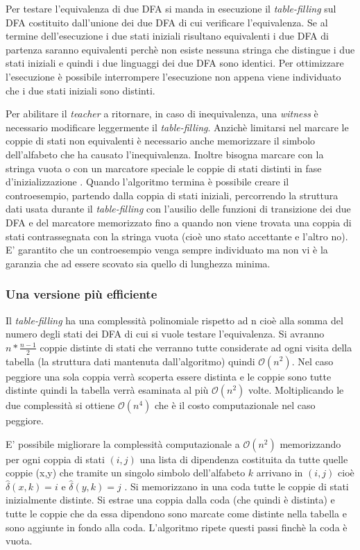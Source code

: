 Per testare l'equivalenza di due DFA si manda in esecuzione il \textit{table-filling} sul DFA costituito dall'unione dei due DFA di cui verificare l'equivalenza. Se al termine dell'esecuzione i due stati iniziali risultano equivalenti i due DFA di partenza saranno equivalenti perchè non esiste nessuna stringa che distingue i due stati iniziali e quindi i due linguaggi dei due DFA sono identici. Per ottimizzare l'esecuzione è possibile interrompere l'esecuzione non appena viene individuato che i due stati iniziali sono distinti.

Per abilitare il \textit{teacher} a ritornare, in caso di inequivalenza, una \textit{witness} è necessario modificare leggermente il \textit{table-filling}. Anzichè limitarsi nel marcare le coppie di stati non equivalenti è necessario anche memorizzare il simbolo dell'alfabeto che ha causato l'inequivalenza. Inoltre bisogna marcare con la stringa vuota o con un marcatore speciale le coppie di stati distinti in fase d'inizializzazione . Quando l'algoritmo termina è possibile creare il controesempio, partendo dalla coppia di stati iniziali, percorrendo la struttura dati usata durante il \textit{table-filling} con l'ausilio delle funzioni di transizione dei due DFA e del marcatore memorizzato fino a quando non viene trovata una coppia di stati contrassegnata con la stringa vuota (cioè uno stato accettante e l'altro no). E' garantito che un controesempio venga sempre individuato ma non vi è la garanzia che ad essere scovato sia quello di lunghezza minima.
\subsubsection{Una versione più efficiente}
Il \textit{table-filling} ha una complessità polinomiale rispetto ad n cioè alla somma del numero degli stati dei DFA di cui si vuole testare l'equivalenza. Si avranno $n*\frac{n-1}{2}$  coppie distinte di stati che verranno tutte considerate ad ogni visita della tabella (la struttura dati mantenuta dall'algoritmo) quindi $\mathcal{O}(n^{2})$. Nel caso peggiore una sola coppia verrà scoperta essere distinta e le coppie sono tutte distinte quindi la tabella verrà esaminata al più $\mathcal{O}(n^{2})$ volte. Moltiplicando le due complessità si ottiene $\mathcal{O}(n^{4})$ che è il costo computazionale nel caso peggiore.

E' possibile migliorare la complessità computazionale a $\mathcal{O}(n^{2})$ memorizzando per ogni coppia di stati $(i,j)$ una lista di dipendenza costituita da tutte quelle coppie (x,y) che tramite un singolo simbolo dell'alfabeto $k$ arrivano in $(i,j)$ cioè $\hat{\delta}(x,k)=i$ e $\hat{\delta}(y,k)=j$ .
Si memorizzano in una coda tutte le coppie di stati inizialmente distinte. Si estrae una coppia dalla coda (che quindi è distinta) e tutte le coppie che da essa dipendono sono marcate come distinte nella tabella e sono aggiunte in fondo alla coda. L'algoritmo ripete questi passi finchè la coda è vuota.